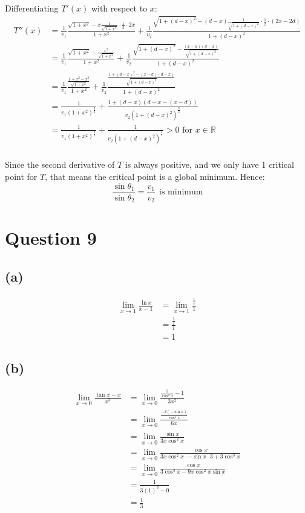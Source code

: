 \documentclass[11pt]{article}
\begin{document}
Differentiating \(T'(x)\) with respect to \(x\):
\begin{align*}
T''(x) &= \frac{1}{v_1} \frac{\sqrt{1 + x^2} - x \frac{1}{\sqrt{1 + x^2}} \cdot \frac{1}{2} \cdot 2x}{1 + x^2}
+ \frac{1}{v_2} \frac{\sqrt{1 + (d - x)^2} - (d - x) \frac{1}{\sqrt{1 + (d - x)^2}} \cdot \frac{1}{2} \cdot (2x - 2d) }{1 + (d - x)^2} \\
&= \frac{1}{v_1} \frac{\sqrt{1 + x^2} - \frac{x^2}{\sqrt{1 + x^2}}}{1 + x^2}
+ \frac{1}{v_2} \frac{\sqrt{1 + (d - x)^2} - \frac{(x - d)(d - x)}{\sqrt{1 + (d - x)^2}}}{1 + (d - x)^2} \\
&= \frac{1}{v_1} \frac{\frac{1 + x^2 - x^2}{\sqrt{1 + x^2}}}{1 + x^2}
+ \frac{1}{v_2} \frac{\frac{1 + (d - x)^2 - (x - d)(d - x)}{\sqrt{1 + (d - x)^2}}}{1 + (d - x)^2} \\
&= \frac{1}{v_1(1 + x^2)^{\frac{3}{2}}}
+ \frac{1 + (d - x)(d - x - (x - d))}{v_2(1 + (d - x)^2)^{\frac{3}{2}}} \\
&= \frac{1}{v_1(1 + x^2)^{\frac{3}{2}}}
+ \frac{1}{v_2(1 + (d - x)^2)^{\frac{3}{2}}} > 0 \text{ for } x \in \mathbb{R} \\
\end{align*}

Since the second derivative of \(T\) is always positive, and we only have 1 critical point for \(T\), that means the critical point is a global minimum. Hence:
\[\frac{\sin \theta_1}{\sin \theta_2} = \frac{v_1}{v_2} \ \ \text{is minimum}\]


\section{Question 9}
\label{sec:org1a5e60b}

\subsection{(a)}
\label{sec:org16d4045}
\begin{align*}
\lim_{x \rightarrow 1} \frac{\ln x}{x - 1} &= \lim_{x \rightarrow 1} \frac{\frac{1}{x}}{1} \\
&= \frac{\frac{1}{1}}{1} \\
&= 1
\end{align*}

\subsection{(b)}
\label{sec:org29d99ed}
\begin{align*}
\lim_{x \rightarrow 0} \frac{\tan x - x}{x^3} &= \lim_{x \rightarrow 0} \frac{\frac{1}{\cos^2 x} - 1}{3x^2} \\
&= \lim_{x \rightarrow 0} \frac{\frac{-2 (- \sin x)}{\cos^3 x}}{6x} \\
&= \lim_{x \rightarrow 0} \frac{\sin x}{3x\cos^3 x} \\
&= \lim_{x \rightarrow 0} \frac{\cos x}{3x \cos^2 x \cdot - \sin x \cdot 3 + 3\cos^3 x} \\
&= \lim_{x \rightarrow 0} \frac{\cos x}{3\cos^3 x - 9x \cos^2 x \sin x} \\
&= \frac{1}{3(1)^3 - 0} \\
&= \frac{1}{3}
\end{align*}
\end{document}
